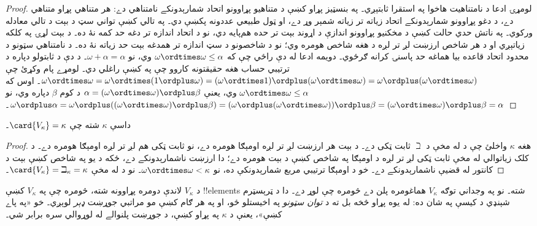 \documentclass[../../../include/open-logic-section]{subfiles}
\begin{document}
\begin{proof}
لومړۍ ادعا د نامتناهيت هاخوا په استقرا ثابتېږي۔
په بنسټيز پړاو کښې د متناهيو پړاوونو اتحاد شمارېدونکے
نامتناهي دے: هر متناهي پړاو متناهي دے، د دغو پړاوونو
شمارېدونکے اتحاد زياته تر زياته شمېر وړ دے، او ټول طبيعي
عددونه پکښې دي۔ په تالي کښې تواني سټ د بېت د تالي معادله
ورکوي۔ په ناتش حدي حالت کښې د مخکنيو پړاوونو اندازې د
اړوند بېت تر حده هم‌پايه دي، نو د اتحاد اندازه تر دغه حد
کمه نۀ ده۔ د بېت لړۍ په کلکه زياتېږي او د هر شاخص ارزښت
لږ تر لږه د هغه شاخص هومره وي؛ نو د شاخصونو د سټ اندازه
تر همدغه بېت حد زياته نۀ ده۔ د نامتناهي سټونو د محدود اتحاد
قاعده بيا هماغه حد پاسنۍ کرانه ګرځوي۔
دويمه ادعا له دې راځي چې که $\omega \ordtimes \omega \leq
\alpha$ وي، نو $\omega + \alpha = \alpha$۔ د دې د
ثابتولو دپاره د ترتيبي حساب هغه حقيقتونه کاروو چې په
 کښې راغلي دي۔ لومړے پام
وکړئ چې $\omega \ordtimes \omega = \omega \ordtimes (1
\ordplus \omega) = ( \omega  \ordtimes 1) \ordplus
(\omega\ordtimes\omega) = \omega
\ordplus (\omega \ordtimes \omega)$۔ اوس که
$\omega \ordtimes \omega \leq \alpha$ وي، يعنې
$\alpha = (\omega\ordtimes\omega) \ordplus \beta$
د کوم $\beta$ دپاره وي، نو $\omega \ordplus \alpha = \omega
\ordplus ((\omega \ordtimes \omega) \ordplus \beta) =
(\omega \ordplus (\omega \ordtimes \omega)) \ordplus
\beta = (\omega \ordtimes \omega) \ordplus \beta =
\alpha$۔
\end{proof}

\begin{cor}
داسې $\kappa$ شته چې $\card{V_\kappa} = \kappa$۔
\end{cor}

\begin{proof}
هغه $\kappa$ واخلئ چې د  له مخې
د $\beth$ ثابت ټکی دے۔ د بېت هر ارزښت لږ تر لږه
اومېګا هومره دے، نو ثابت ټکی هم لږ تر لږه اومېګا
هومره دے۔ د کلک زياتوالي له مخې ثابت ټکی لږ تر
لږه د اومېګا په شاخص کښې د بېت هومره دے؛ دا ارزښت
ناشمارېدونکے دے، ځکه د يو په شاخص کښې بېت د کانتور
له قضيې ناشمارېدونکے دے۔ خو د اومېګا ترتيبي مربع
شمارېدونکې ده، نو $\omega \ordtimes
\omega < \kappa$۔ نو د  له مخې
$\card{V_\kappa} = \beth_\kappa= \kappa$۔
\end{proof}

د $V_\kappa$ لاندې دومره پړاوونه شته، څومره چې په
$V_\kappa$ کښې !!{element}s شته۔ نو په وجداني توګه
$V_\kappa$ هماغومره پلن دے څومره چې لوړ دے۔
دا د ټرېسټرم شېنډي د کيسې په شان ده: له يوه پړاو څخه
بل ته د \emph{توان سټونو} په اخيستلو ځو، او په هر
ګام کښې مو مراتبي جوړښت \emph{ډېر} لوېږي۔ خو «په
پاے کښې»، يعنې د $\kappa$ په پړاو کښې، د جوړښت
پلنوالے له لوړوالي سره برابر شي۔
\end{document}
